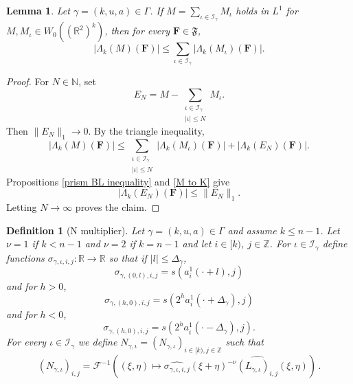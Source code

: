\documentclass[12pt,reqno]{amsart}
\theoremstyle{plain}
\newtheorem{lemma}[theorem]{Lemma}
\newtheorem{definition}[theorem]{Definition}
\numberwithin{equation}{section}
\theoremstyle{remark}
\newcommand{\uses}[1]{}
\newcommand{\usesdefs}[1]{}
\newcommand{\Z}{{\mathbb Z}}
\newcommand{\R}{{\mathbb R}}
\newcommand{\N}{{\mathbb N}}
\begin{document}
\begin{lemma}\label{prism sum le sum prism-L1}\uses{prism BL inequality,M to K}\usesdefs{auto:Wiener-space-definition,normalized function tuples,auto:prism-form-definition,geometric parameters,L multiplier,summation-definition}
Let $\gamma=(k,u,a)\in \Gamma$.
If $M=\sum_{\iota\in \mathcal{I}_\gamma} M_\iota$ holds in $L^1$ for $M,M_\iota\in W_0((\R^2)^k)$, then for every $\mathbf{F}\in\mathfrak{F}$,
\begin{equation}\label{auto:prism-form-series-bound} |\Lambda_k(M)(\mathbf{F})| \le \sum_{\iota\in \mathcal{I}_\gamma} |\Lambda_k(M_\iota)(\mathbf{F})|. \end{equation}
\end{lemma}


\begin{proof}
For $N\in\N$, set
\[
E_N=M-\sum_{\substack{\iota\in\mathcal I_\gamma\\|\iota|\le N}}M_\iota.
\]
Then $\|E_N\|_1\to0$. By the triangle inequality,
\[
|\Lambda_k(M)(\mathbf F)|
\le
\sum_{\substack{\iota\in\mathcal I_\gamma\\|\iota|\le N}}
|\Lambda_k(M_\iota)(\mathbf F)|
+|\Lambda_k(E_N)(\mathbf F)|.
\]
Propositions \ref{prism BL inequality} and \ref{M to K} give
\[
|\Lambda_k(E_N)(\mathbf F)|\le\|E_N\|_1.
\]
Letting $N\to\infty$ proves the claim.
\end{proof}


\begin{definition}[N multiplier]\label{N multiplier}\uses{}\usesdefs{geometric parameters,square root Gaussian difference,L multiplier}
  Let $\gamma=(k,u,a)\in \Gamma$ and assume $k\le n-1$.
Let $\nu=1$ if $k<n-1$ and $\nu=2$ if $k=n-1$ and let $i\in [k)$, $j\in \Z$.
For $\iota\in\mathcal{I}_{\gamma}$ define functions $\sigma_{\gamma,\iota,i,j}:\R\to\R$ so that
if $|l|\le \Delta_{\gamma}$,
\begin{equation}\label{auto:sigma-central-band} \sigma_{\gamma,(0,l),i,j} = s(a_i^1(\cdot+l), j) \end{equation}
and for $h>0$,
\begin{equation}\label{auto:sigma-positive-band} \sigma_{\gamma,(h,0),i,j} = s(2^h a_i^1(\cdot+\Delta_{\gamma}), j) \end{equation}
and for $h<0$,
\begin{equation}\label{auto:sigma-negative-band} \sigma_{\gamma,(h,0),i,j} = s(2^h a_i^1(\cdot-\Delta_{\gamma}), j). \end{equation}
For every $\iota\in\mathcal{I}_{\gamma}$ we define $N_{\gamma,\iota}= (N_{\gamma,\iota})_{i\in [k),j\in \Z}$ such that
\begin{equation}\label{auto:N-kernel-definition}
 (N_{\gamma,\iota})_{i,j} =
 \mathcal F^{-1}((\xi,\eta) \mapsto \widehat{\sigma_{\gamma,\iota,i,j}}(\xi+\eta)^{-\nu}\widehat{(L_{\gamma,\iota})_{i,j}}(\xi,\eta))\, .
\end{equation}
\end{definition}
\end{document}
